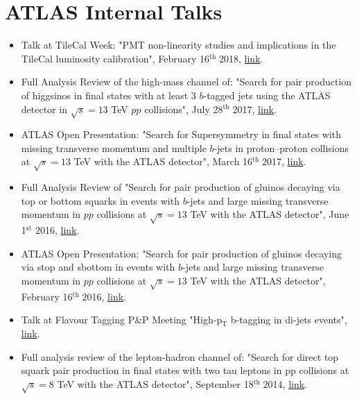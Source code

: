 \documentclass[11pt,a4paper]{moderncv}
\newcommand{\dayth}{$^\mathrm{th}\;$}
\begin{document}
\section{ATLAS Internal Talks}
\begin{itemize}
\item Talk at TileCal Week: "PMT non-linearity studies and implications in the TileCal luminosity calibration", February 16\dayth 2018, \href{https://indico.cern.ch/event/703027/contributions/2894678/attachments/1601891/2539936/chiara_pmt.pdf}{\color{color1}link}.
\item Full Analysis Review of the high-mass channel of: "Search for pair production of higgsinos in final states with at least 3 $b$-tagged jets using the ATLAS detector in $\sqrt{s} = 13$ TeV $pp$ collisions", July 28\dayth 2017, \href{https://indico.cern.ch/event/656418/contributions/2674288/attachments/1500826/2337270/FAR_hh4b_v2.pdf}{\color{color1}link}.
\item ATLAS Open Presentation: "Search for Supersymmetry in final states with missing transverse momentum and multiple $b$-jets in proton--proton collisions at $\sqrt{s} = 13$ TeV with the ATLAS detector", March 16\dayth 2017, \href{https://indico.cern.ch/event/622781/contributions/2512064/attachments/1429263/2194530/open_presentation.pdf}{\color{color1}link}.
\item Full Analysis Review of "Search for pair production of gluinos decaying via top or bottom squarks in events with $b$-jets and large missing transverse momentum in $pp$ collisions at $\sqrt{s}=13$ TeV with the ATLAS detector", June 1$^{\mathrm{st}}$ 2016, \href{https://indico.cern.ch/event/532982/contributions/2188946/attachments/1282936/1906831/FAR_Multib_chiara.pdf}{\color{color1}link}.
\item ATLAS Open Presentation: "Search for pair production of gluinos decaying via stop and sbottom in events with $b$-jets and large missing transverse momentum in $pp$ collisions at $\sqrt{s} = 13$ TeV with the ATLAS detector", February 16\dayth 2016, \href{https://indico.cern.ch/event/496698/contributions/1175271/attachments/1229520/1801685/open_presentation.pdf}{\color{color1}link}.
\item Talk at Flavour Tagging P\&P Meeting "High-p$_\mathrm{T}$ b-tagging in di-jets events", \href{https://indico.cern.ch/event/437597/contributions/1924966/attachments/1150999/1652290/Sept8.pdf}{\color{color1}link}.
\item Full analysis review of the lepton-hadron channel of: "Search for direct top squark pair production in final states with two tau leptons in pp collisions at $\sqrt{s}=8$  TeV with the ATLAS detector", September 18\dayth 2014, \href{https://indico.cern.ch/event/278649/contributions/1624956/attachments/509623/703359/FAR_Sept18.pdf}{\color{color1}link}.
\end{itemize}
\end{document}

